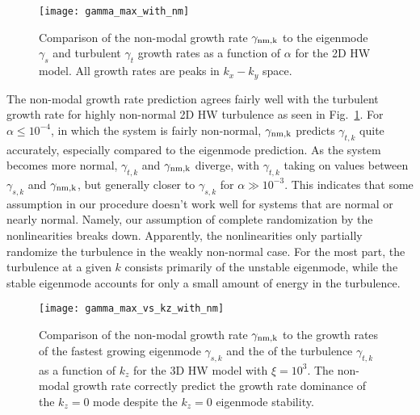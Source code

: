 \documentclass[letter,scriptaddress,twocolumn, prl,showkeys]{revtex4}
\begin{document}

\begin{figure}
\centerline{\texttt{[image: gamma\_max\_with\_nm]}}
\caption{Comparison of the non-modal growth rate $\gamma_{\rm{nm},k}$ to the eigenmode $\gamma_{s}$ and turbulent $\gamma_{t}$ growth rates as a function of $\alpha$
for the 2D HW model. All growth rates are peaks in $k_x-k_y$ space.}
\label{gamma_max_with_nm}
\end{figure}

The non-modal growth rate prediction agrees fairly well with the turbulent growth rate for highly non-normal 2D HW turbulence as seen in Fig.~\ref{gamma_max_with_nm}. For $\alpha \le 10^{-4}$,
in which the system is fairly non-normal, $\gamma_{\rm{nm},k}$ predicts $\gamma_{t,k}$ quite accurately, especially compared to the eigenmode prediction. 
As the system becomes more normal, $\gamma_{t,k}$ and $\gamma_{\rm{nm},k}$ diverge, with $\gamma_{t,k}$ taking on values between $\gamma_{s,k}$ and $\gamma_{\rm{nm},k}$, 
but generally closer to $\gamma_{s,k}$ for $\alpha \gg 10^{-3}$. 
This indicates that some assumption in our procedure doesn't work well for systems that are normal or nearly normal. Namely, our assumption
of complete randomization by the nonlinearities breaks down. Apparently, the nonlinearities only partially randomize the turbulence in the weakly non-normal case. 
For the most part, the turbulence at a given $k$ consists primarily of the unstable eigenmode, while the stable eigenmode accounts for only a small amount of energy in the turbulence.

\begin{figure}
\centerline{\texttt{[image: gamma\_max\_vs\_kz\_with\_nm]}}
\caption{Comparison of the non-modal growth rate $\gamma_{\rm{nm},k}$ to the growth rates of the fastest growing eigenmode $\gamma_{s,k}$ 
and the of the turbulence $\gamma_{t,k}$ as a function of $k_z$ for the 3D HW model with $\xi = 10^3$. The non-modal growth rate correctly predict the growth rate dominance of the $k_z=0$ mode
despite the $k_z=0$ eigenmode stability.}
\label{gamma_max_vs_kz_with_nm}
\end{figure}
\end{document}
